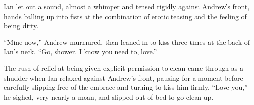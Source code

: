 Ian let out a sound, almost a whimper and tensed rigidly against Andrew's front, hands balling up into fists at the combination of erotic teasing and the feeling of being dirty.

``Mine now,'' Andrew murmured, then leaned in to kiss three times at the back of Ian's neck. ``Go, shower. I know you need to, love.''

The rush of relief at being given explicit permission to clean came through as a shudder when Ian relaxed against Andrew's front, pausing for a moment before carefully slipping free of the embrace and turning to kiss him firmly. ``Love you,'' he sighed, very nearly a moan, and slipped out of bed to go clean up.
